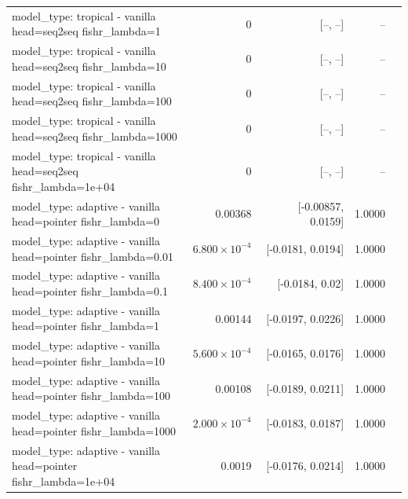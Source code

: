\documentclass[10pt]{article}
\makeatletter
\newcommand{\stackcell}[1]{\begin{tabular}[t]{@{}l@{}}#1\end{tabular}}
\makeatother
\begin{document}
{\begin{longtable}{lrrrl}
\stackcell{model\_type: tropical - vanilla\\\footnotesize head=seq2seq fishr\_lambda=1 } & 0 & [--, --] & -- & \\
\stackcell{model\_type: tropical - vanilla\\\footnotesize head=seq2seq fishr\_lambda=10 } & 0 & [--, --] & -- & \\
\stackcell{model\_type: tropical - vanilla\\\footnotesize head=seq2seq fishr\_lambda=100 } & 0 & [--, --] & -- & \\
\stackcell{model\_type: tropical - vanilla\\\footnotesize head=seq2seq fishr\_lambda=1000 } & 0 & [--, --] & -- & \\
\stackcell{model\_type: tropical - vanilla\\\footnotesize head=seq2seq fishr\_lambda=1e+04 } & 0 & [--, --] & -- & \\
\stackcell{model\_type: adaptive - vanilla\\\footnotesize head=pointer fishr\_lambda=0 } & 0.00368 & [-0.00857, 0.0159] & 1.0000 & \\
\stackcell{model\_type: adaptive - vanilla\\\footnotesize head=pointer fishr\_lambda=0.01 } & $6.800\times10^{-4}$ & [-0.0181, 0.0194] & 1.0000 & \\
\stackcell{model\_type: adaptive - vanilla\\\footnotesize head=pointer fishr\_lambda=0.1 } & $8.400\times10^{-4}$ & [-0.0184, 0.02] & 1.0000 & \\
\stackcell{model\_type: adaptive - vanilla\\\footnotesize head=pointer fishr\_lambda=1 } & 0.00144 & [-0.0197, 0.0226] & 1.0000 & \\
\stackcell{model\_type: adaptive - vanilla\\\footnotesize head=pointer fishr\_lambda=10 } & $5.600\times10^{-4}$ & [-0.0165, 0.0176] & 1.0000 & \\
\stackcell{model\_type: adaptive - vanilla\\\footnotesize head=pointer fishr\_lambda=100 } & 0.00108 & [-0.0189, 0.0211] & 1.0000 & \\
\stackcell{model\_type: adaptive - vanilla\\\footnotesize head=pointer fishr\_lambda=1000 } & $2.000\times10^{-4}$ & [-0.0183, 0.0187] & 1.0000 & \\
\stackcell{model\_type: adaptive - vanilla\\\footnotesize head=pointer fishr\_lambda=1e+04 } & 0.0019 & [-0.0176, 0.0214] & 1.0000 & \\

\end{longtable}}
\end{document}
